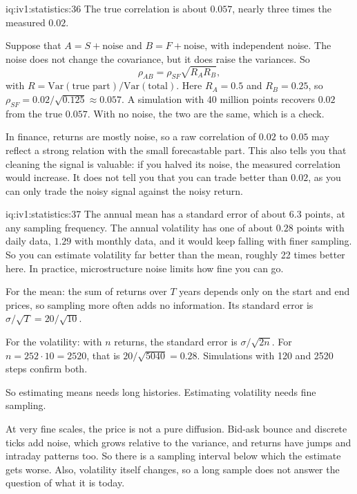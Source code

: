 \begin{solution}{iq:iv1:statistics:36}
The true correlation is about $0.057$, nearly three times the measured $0.02$.

Suppose that $A = S + \text{noise}$ and $B = F + \text{noise}$, with independent noise. The noise does not change the covariance, but it does raise the variances. So
\[
\rho_{AB} = \rho_{SF}\sqrt{R_A R_B},
\]
with $R = \mathrm{Var}(\text{true part})/\mathrm{Var}(\text{total})$. Here $R_A = 0.5$ and $R_B = 0.25$, so $\rho_{SF} = 0.02/\sqrt{0.125} \approx 0.057$. A simulation with 40 million points recovers $0.02$ from the true $0.057$. With no noise, the two are the same, which is a check.

In finance, returns are mostly noise, so a raw correlation of $0.02$ to $0.05$ may reflect a strong relation with the small forecastable part. This also tells you that cleaning the signal is valuable: if you halved its noise, the measured correlation would increase. It does not tell you that you can trade better than $0.02$, as you can only trade the noisy signal against the noisy return.

\end{solution}

\begin{solution}{iq:iv1:statistics:37}
The annual mean has a standard error of about $6.3$ points, at any sampling frequency. The annual volatility has one of about $0.28$ points with daily data, $1.29$ with monthly data, and it would keep falling with finer sampling. So you can estimate volatility far better than the mean, roughly 22 times better here. In practice, microstructure noise limits how fine you can go.

For the mean: the sum of returns over $T$ years depends only on the start and end prices, so sampling more often adds no information. Its standard error is $\sigma/\sqrt{T} = 20/\sqrt{10}$.

For the volatility: with $n$ returns, the standard error is $\sigma/\sqrt{2n}$. For $n = 252 \cdot 10 = 2520$, that is $20/\sqrt{5040} = 0.28$. Simulations with 120 and 2520 steps confirm both.

So estimating means needs long histories. Estimating volatility needs fine sampling.

At very fine scales, the price is not a pure diffusion. Bid-ask bounce and discrete ticks add noise, which grows relative to the variance, and returns have jumps and intraday patterns too. So there is a sampling interval below which the estimate gets worse. Also, volatility itself changes, so a long sample does not answer the question of what it is today.

\end{solution}

